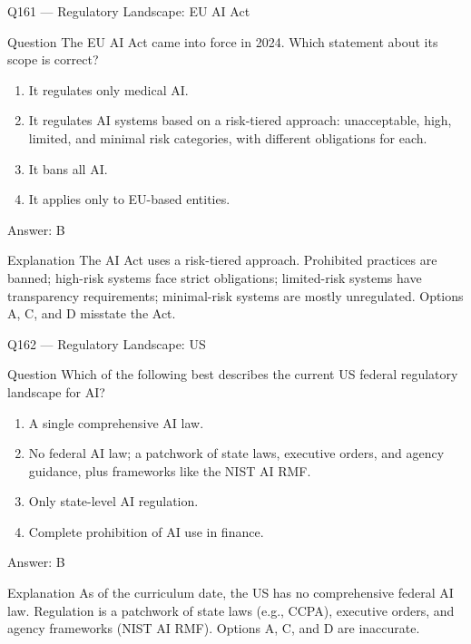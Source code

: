 \documentclass[aspectratio=169,8pt]{beamer}
\begin{document}
\begin{frame}{Q161 --- Regulatory Landscape: EU AI Act}
\begin{block}{Question}
The EU AI Act came into force in 2024. Which statement about its scope is correct?
\begin{enumerate}
\item It regulates only medical AI.
\item It regulates AI systems based on a risk-tiered approach: unacceptable, high, limited, and minimal risk categories, with different obligations for each.
\item It bans all AI.
\item It applies only to EU-based entities.
\end{enumerate}  \end{block}
\begin{exampleblock}{Answer: B}\end{exampleblock}
\begin{block}{Explanation}
The AI Act uses a risk-tiered approach. Prohibited practices are banned; high-risk systems face strict obligations; limited-risk systems have transparency requirements; minimal-risk systems are mostly unregulated. Options A, C, and D misstate the Act.
\end{block}
\end{frame}

\begin{frame}{Q162 --- Regulatory Landscape: US}
\begin{block}{Question}
Which of the following best describes the current US federal regulatory landscape for AI?
\begin{enumerate}
\item A single comprehensive AI law.
\item No federal AI law; a patchwork of state laws, executive orders, and agency guidance, plus frameworks like the NIST AI RMF.
\item Only state-level AI regulation.
\item Complete prohibition of AI use in finance.
\end{enumerate}  \end{block}
\begin{exampleblock}{Answer: B}\end{exampleblock}
\begin{block}{Explanation}
As of the curriculum date, the US has no comprehensive federal AI law. Regulation is a patchwork of state laws (e.g., CCPA), executive orders, and agency frameworks (NIST AI RMF). Options A, C, and D are inaccurate.
\end{block}
\end{frame}
\end{document}
